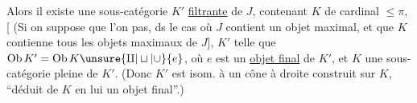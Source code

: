Alors il existe une sous-catégorie $K'$  \uline{filtrante} de $J$, contenant $K$ de cardinal $\leq\pi$, [   (Si on suppose que l'on  pas,  ds le cas où $J$ contient un objet maximal, et que $K$ contienne tous les objets maximaux de $J$],
 $K'$ telle que $\mathrm{Ob}\,K'=\mathrm{Ob}\,K\unsure{\amalg|\sqcup|\cup}\{e\}$, où $e$ est un \uline{objet final} de $K'$, et $K$    une sous-catégorie pleine de $K'$. (Donc  $K'$ est isom. à un cône à droite construit sur $K$, ``déduit de $K$ en lui  un objet final''.)

